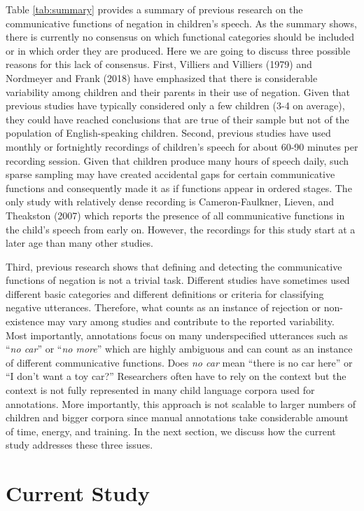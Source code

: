 \documentclass[
  english,
  man,floatsintext]{apa6}
\begin{document}
Table \ref{tab:summary} provides a summary of previous research on the communicative functions of negation in children's speech. As the summary shows, there is currently no consensus on which functional categories should be included or in which order they are produced. Here we are going to discuss three possible reasons for this lack of consensus. First, Villiers and Villiers (1979) and Nordmeyer and Frank (2018) have emphasized that there is considerable variability among children and their parents in their use of negation. Given that previous studies have typically considered only a few children (3-4 on average), they could have reached conclusions that are true of their sample but not of the population of English-speaking children. Second, previous studies have used monthly or fortnightly recordings of children's speech for about 60-90 minutes per recording session. Given that children produce many hours of speech daily, such sparse sampling may have created accidental gaps for certain communicative functions and consequently made it as if functions appear in ordered stages. The only study with relatively dense recording is Cameron-Faulkner, Lieven, and Theakston (2007) which reports the presence of all communicative functions in the child's speech from early on. However, the recordings for this study start at a later age than many other studies.

Third, previous research shows that defining and detecting the communicative functions of negation is not a trivial task. Different studies have sometimes used different basic categories and different definitions or criteria for classifying negative utterances. Therefore, what counts as an instance of rejection or non-existence may vary among studies and contribute to the reported variability. Most importantly, annotations focus on many underspecified utterances such as ``\emph{no car}'' or ``\emph{no more}'' which are highly ambiguous and can count as an instance of different communicative functions. Does \emph{no car} mean ``there is no car here'' or ``I don't want a toy car?'' Researchers often have to rely on the context but the context is not fully represented in many child language corpora used for annotations. More importantly, this approach is not scalable to larger numbers of children and bigger corpora since manual annotations take considerable amount of time, energy, and training. In the next section, we discuss how the current study addresses these three issues.

\hypertarget{current-study}{%
\section{Current Study}\label{current-study}}
\end{document}

